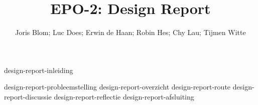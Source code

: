 \documentclass{report}
\title{EPO-2: Design Report}
\author{Joris Blom; Luc Does; Erwin de Haan; Robin Hes; Chy Lau; Tijmen Witte}
\begin{document}
\maketitle
\newpage
{}

{design-report-inleiding}
\tableofcontents

\newpage
{}

{design-report-probleemstelling}
{design-report-overzicht}
{design-report-route}
{design-report-discussie}
{design-report-reflectie}
{design-report-afsluiting}

\newpage
{}

\printbibliography
\end{document}
